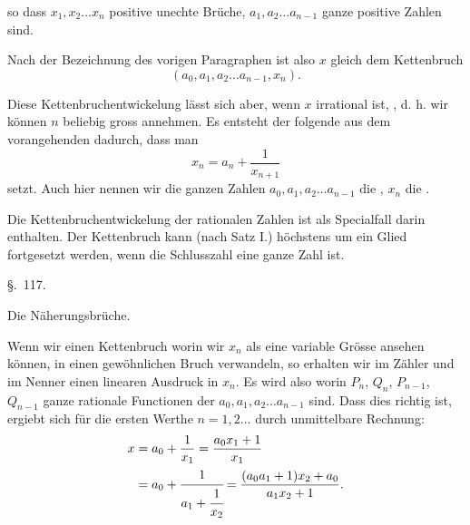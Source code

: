 so dass $x_1, x_2 \ldots x_n$ positive unechte Br\"uche, $a_1, a_2 \ldots a_{n-1}$ ganze positive Zahlen sind.

Nach der Bezeichnung des vorigen Paragraphen ist also $x$ gleich dem Kettenbruch
\[
(a_0, a_1, a_2 \ldots a_{n-1}, x_n).
\]

Diese Kettenbruchentwickelung l\"asst sich aber, wenn $x$ irrational ist, , d. h. wir k\"onnen $n$ beliebig gross annehmen. Es entsteht der folgende aus dem vorangehenden dadurch, dass man
\[
x_n = a_n + \frac{1}{x_{n+1}}
\]
setzt. Auch hier nennen wir die ganzen Zahlen $a_0, a_1, a_2 \ldots a_{n-1}$ die , $x_n$ die .

Die Kettenbruchentwickelung der rationalen Zahlen ist als Specialfall darin enthalten. Der Kettenbruch kann (nach Satz I.) h\"ochstens um ein Glied fortgesetzt werden, wenn die Schlusszahl eine ganze Zahl ist.

\begin{center}
\S.\ 117.

Die N\"aherungsbr\"uche.
\end{center}

Wenn wir einen Kettenbruch
worin wir $x_n$ als eine variable Gr\"osse ansehen k\"onnen, in einen gew\"ohnlichen Bruch verwandeln, so erhalten wir im Z\"ahler und im Nenner einen linearen Ausdruck in $x_n$. Es wird also
worin $P_n$, $Q_n$, $P_{n-1}$, $Q_{n-1}$ ganze rationale Functionen der $a_0, a_1, a_2 \ldots a_{n-1}$ sind. Dass dies richtig ist, ergiebt sich f\"ur die ersten Werthe $n = 1, 2 \ldots$ durch unmittelbare Rechnung:
\[
\begin{aligned}
x &= a_0 + \frac{1}{x_1} = \frac{a_0 x_1 + 1}{x_1}\\
&= a_0 + \cfrac{1}{a_1 + \cfrac{1}{x_2}} = \frac{(a_0 a_1 + 1)x_2 + a_0}{a_1 x_2 + 1}.
\end{aligned}
\]
